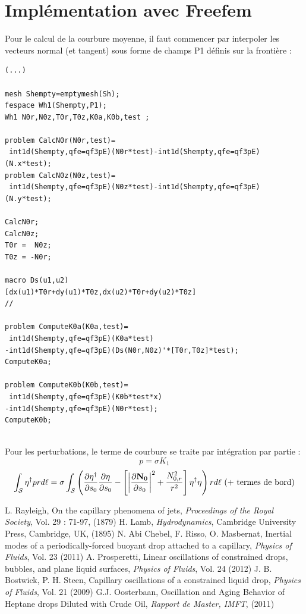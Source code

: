 \documentclass[a4paper]{report}
\newcommand\DP[2]{\frac{\partial #1}{\partial #2}}
\begin{document}
\section{Implémentation avec Freefem}
Pour le calcul de la courbure moyenne, il faut commencer par interpoler les vecteurs normal (et tangent) sous forme de champs P1 définis sur la frontière :
\begin{verbatim}
(...)

mesh Shempty=emptymesh(Sh);
fespace Wh1(Shempty,P1);
Wh1 N0r,N0z,T0r,T0z,K0a,K0b,test ;

problem CalcN0r(N0r,test)=
 int1d(Shempty,qfe=qf3pE)(N0r*test)-int1d(Shempty,qfe=qf3pE)(N.x*test);
problem CalcN0z(N0z,test)=
 int1d(Shempty,qfe=qf3pE)(N0z*test)-int1d(Shempty,qfe=qf3pE)(N.y*test);

CalcN0r;
CalcN0z;
T0r =  N0z;
T0z = -N0r;

macro Ds(u1,u2)
[dx(u1)*T0r+dy(u1)*T0z,dx(u2)*T0r+dy(u2)*T0z]
//

problem ComputeK0a(K0a,test)=
 int1d(Shempty,qfe=qf3pE)(K0a*test)
-int1d(Shempty,qfe=qf3pE)(Ds(N0r,N0z)'*[T0r,T0z]*test);
ComputeK0a;

problem ComputeK0b(K0b,test)=
 int1d(Shempty,qfe=qf3pE)(K0b*test*x)
-int1d(Shempty,qfe=qf3pE)(N0r*test);
ComputeK0b;


\end{verbatim}
Pour les perturbations, le terme de courbure se traite par intégration par partie :
$$
p = \sigma K_1 
$$
$$
\int_{\cal S}  \eta^\dag p r d \ell 
 = \sigma 
 \int_{\cal S} \left (
 \DP{\eta^\dag}{s_0} \DP{\eta}{s_0} - \left[ \left| \DP{\bf N_0}{s_0} \right|^2  + \frac{N_{0,r}^2}{r^2} \right]  \eta^\dag \eta \right) r d \ell 
\mbox{ (+ termes de bord)} 
$$



\begin{thebibliography}{99}
 L. Rayleigh, On the capillary phenomena of jets, \emph{Proceedings of the Royal Society}, Vol. 29 : 71-97, (1879)
 H. Lamb, \emph{Hydrodynamics}, Cambridge University Press, Cambridge, UK, (1895)
 N. Abi Chebel, F. Risso, O. Masbernat, Inertial modes of a periodically-forced buoyant drop attached to a capillary, \emph{Physics of Fluids}, Vol. 23 (2011)
 A. Prosperetti, Linear oscillations of constrained drops, bubbles, and plane liquid surfaces, \emph{Physics of Fluids}, Vol. 24 (2012)
 J. B. Bostwick, P. H. Steen, Capillary oscillations of a constrained liquid drop, \emph{Physics of Fluids}, Vol. 21 (2009)
 G.J. Oosterbaan, Oscillation and Aging Behavior of Heptane drops Diluted with Crude Oil, \emph{Rapport de Master, IMFT}, (2011)
\end{thebibliography}
\end{document}
